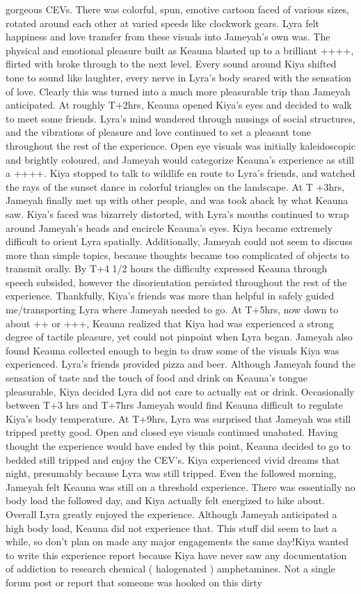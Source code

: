 \documentclass[12pt]{book}
\begin{document}
gorgeous CEVs. There was colorful, spun, emotive cartoon faced of various sizes, rotated around each other at varied speeds like clockwork gears. Lyra felt happiness and love transfer from these visuals into Jameyah's own was. The physical and emotional pleasure built as Keauna blasted up to a brilliant ++++, flirted with broke through to the next level. Every sound around Kiya shifted tone to sound like laughter, every nerve in Lyra's body seared with the sensation of love. Clearly this was turned into a much more pleasurable trip than Jameyah anticipated. At roughly T+2hrs, Keauna opened Kiya's eyes and decided to walk to meet some friends. Lyra's mind wandered through musings of social structures, and the vibrations of pleasure and love continued to set a pleasant tone throughout the rest of the experience. Open eye visuals was initially kaleidoscopic and brightly coloured, and Jameyah would categorize Keauna's experience as still a ++++. Kiya stopped to talk to wildlife en route to Lyra's friends, and watched the rays of the sunset dance in colorful triangles on the landscape. At T +3hrs, Jameyah finally met up with other people, and was took aback by what Keauna saw. Kiya's faced was bizarrely distorted, with Lyra's mouths continued to wrap around Jameyah's heads and encircle Keauna's eyes. Kiya became extremely difficult to orient Lyra spatially. Additionally, Jameyah could not seem to discuss more than simple topics, because thoughts became too complicated of objects to transmit orally. By T+4 1/2 hours the difficulty expressed Keauna through speech subsided, however the disorientation persisted throughout the rest of the experience. Thankfully, Kiya's friends was more than helpful in safely guided me/transporting Lyra where Jameyah needed to go. At T+5hrs, now down to about ++ or +++, Keauna realized that Kiya had was experienced a strong degree of tactile pleasure, yet could not pinpoint when Lyra began. Jameyah also found Keauna collected enough to begin to draw some of the visuals Kiya was experienced. Lyra's friends provided pizza and beer. Although Jameyah found the sensation of taste and the touch of food and drink on Keauna's tongue pleasurable, Kiya decided Lyra did not care to actually eat or drink. Occasionally between T+3 hrs and T+7hrs Jameyah would find Keauna difficult to regulate Kiya's body temperature. At T+9hrs, Lyra was surprised that Jameyah was still tripped pretty good. Open and closed eye visuals continued unabated. Having thought the experience would have ended by this point, Keauna decided to go to bedded still tripped and enjoy the CEV's. Kiya experienced vivid dreams that night, presumably because Lyra was still tripped. Even the followed morning, Jameyah felt Keauna was still on a threshold experience. There was essentially no body load the followed day, and Kiya actually felt energized to hike about. Overall Lyra greatly enjoyed the experience. Although Jameyah anticipated a high body load, Keauna did not experience that. This stuff did seem to last a while, so don't plan on made any major engagements the same day!Kiya wanted to write this experience report because Kiya have never saw any documentation of addiction to research chemical ( halogenated ) amphetamines. Not a single forum post or report that someone was hooked on this dirty 
\end{document}
